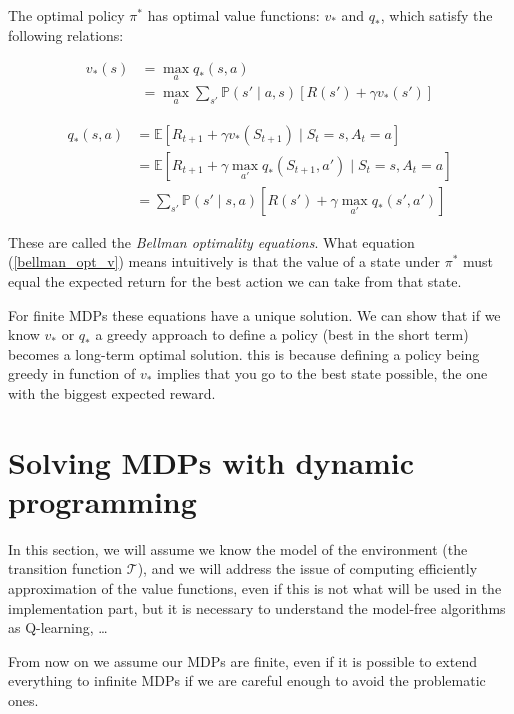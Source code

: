 \documentclass[14pt,a4paper]{article}
\theoremstyle{definition}
\begin{document}
The optimal policy $\pi^*$ has  optimal value functions: $v_* $ and $ q_*$, which satisfy the following relations:

\begin{equation}
\begin{split}
v_{*}(s)&=\max_{a}q_{*}(s,a)
\\&=\max_{a} \sum_{s'}\mathbb{P}(s'\mid a,s)\left[R(s')+\gamma v_{*}(s')\right]
\end{split}
\label{bellman_opt_v}
\end{equation}

\begin{equation}
\begin{split}
q_{*}(s,a)&=\mathbb{E}\left[ R_{t+1} + \gamma v_{*}(S_ {t+1}) \mid S_t = s, A_t = a \right]
\\&=\mathbb{E}\left[ R_{t+1} + \gamma \max_{a'} q_{*}(S_{t+1},a') \mid S_t = s, A_t = a \right]
\\&= \sum_{s'}\mathbb{P}(s' \mid s,a)[R(s')+\gamma \max_{a'}q_{*}(s',a')]
\end{split}
\label{bellman_opt_q}
\end{equation}

These are called the \emph{Bellman optimality equations}. What equation (\ref{bellman_opt_v}) means intuitively is that the value of a state under $\pi^*$ must equal the expected return for the best action we can take from that state.


For finite MDPs these equations have a unique solution. We can show that if we know $v_{*}$ or $q_{*}$ a greedy approach to define a policy (best in the short term) becomes a long-term optimal solution. this is because defining a policy being greedy in function of $v_*$ implies that you go to the best state possible, the one with the biggest expected reward.


\section{Solving MDPs with dynamic programming}

In this section, we will assume we know the model of the environment (the transition function $\mathcal{T}$), and we will address the issue of computing efficiently approximation of the value functions, even if this is not what will be used in the implementation part, but it is necessary to understand the model-free algorithms as Q-learning, \ldots

From now on we assume our MDPs are finite, even if it is possible to extend everything to infinite MDPs if we are careful enough to avoid the problematic ones. \citep{Sutton}
\end{document}
